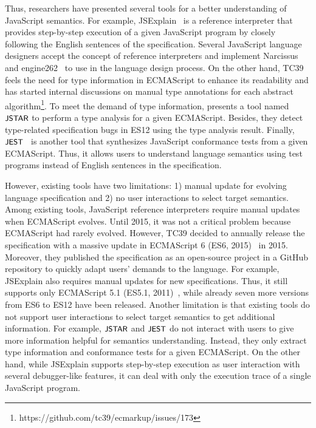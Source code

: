 Thus, researchers have presented several tools for a better understanding of
JavaScript semantics. For example, JSExplain~\cite{jsexplain} is a reference
interpreter that provides step-by-step execution of a given JavaScript program
by closely following the English sentences of the specification. Several
JavaScript language designers accept the concept of reference interpreters and
implement Narcissus~\cite{narcissus} and engine262~\cite{engine262} to use in
the language design process. On the other hand, TC39 feels the need for type
information in ECMAScript to enhance its readability and has started internal
discussions on manual type annotations for each abstract
algorithm\footnote{https://github.com/tc39/ecmarkup/issues/173}. To meet the
demand of type information, \citet{jstar} presents a tool named $\textsf{\small JSTAR}$ to
perform a type analysis for a given ECMAScript. Besides, they detect
type-related specification bugs in ES12 using the type analysis result. Finally,
$\textsf{\small JEST}$~\cite{jest} is another tool that synthesizes JavaScript conformance
tests from a given ECMAScript. Thus, it allows users to understand language
semantics using test programs instead of English sentences in the specification.

However, existing tools have two limitations: 1) manual update for evolving
language specification and 2) no user interactions to select target semantics.
Among existing tools, JavaScript reference interpreters require manual updates
when ECMAScript evolves. Until 2015, it was not a critical problem because
ECMAScript had rarely evolved. However, TC39 decided to annually release the
specification with a massive update in ECMAScript 6 (ES6, 2015)~\cite{es6} in
2015. Moreover, they published the specification as an open-source project in a
GitHub repository to quickly adapt users' demands to the language. For example,
JSExplain also requires manual updates for new specifications. Thus, it still
supports only ECMAScript 5.1 (ES5.1, 2011)~\cite{es5}, while already seven more
versions from ES6 to ES12 have been released. Another limitation is that
existing tools do not support user interactions to select target semantics to
get additional information. For example, $\textsf{\small JSTAR}$ and $\textsf{\small JEST}$ do not interact
with users to give more information helpful for semantics understanding.
Instead, they only extract type information and conformance tests for a given
ECMAScript. On the other hand, while JSExplain supports step-by-step execution
as user interaction with several debugger-like features, it can deal with only
the execution trace of a single JavaScript program.

